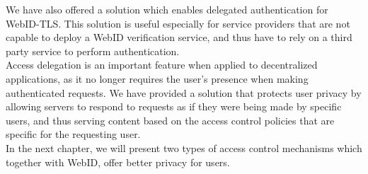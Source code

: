 We have also offered a solution which enables delegated authentication for WebID-TLS. This solution is useful especially for service providers that are not capable to deploy a WebID verification service, and thus have to rely on a third party service to perform  authentication.\\

Access delegation is an important feature when applied to decentralized applications, as it no longer requires the user's presence when making authenticated requests. We have provided a solution that protects user privacy by allowing servers to respond to requests as if they were being made by specific users, and thus serving content based on the access control policies that are specific for the requesting user.\\

In the next chapter, we will present two types of access control mechanisms which together with WebID, offer better privacy for users.